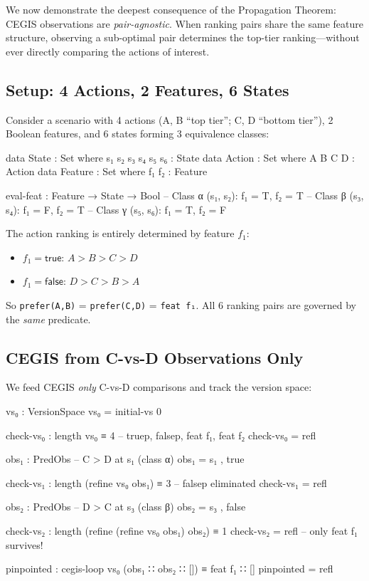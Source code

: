 We now demonstrate the deepest consequence of the Propagation Theorem: CEGIS observations are \emph{pair-agnostic}.  When ranking pairs share the same feature structure, observing a sub-optimal pair determines the top-tier ranking---without ever directly comparing the actions of interest.

\subsection{Setup: 4 Actions, 2 Features, 6 States}

Consider a scenario with 4 actions (A, B ``top tier''; C, D ``bottom tier''), 2 Boolean features, and 6 states forming 3 equivalence classes:

\begin{spec}
data State : Set where s₁ s₂ s₃ s₄ s₅ s₆ : State
data Action : Set where A B C D : Action
data Feature : Set where f₁ f₂ : Feature

eval-feat : Feature → State → Bool
-- Class α (s₁, s₂): f₁ = T, f₂ = T
-- Class β (s₃, s₄): f₁ = F, f₂ = T
-- Class γ (s₅, s₆): f₁ = T, f₂ = F
\end{spec}

\noindent The action ranking is entirely determined by feature $f_1$:
\begin{itemize}
\item $f_1 = \mathsf{true}$: $A > B > C > D$
\item $f_1 = \mathsf{false}$: $D > C > B > A$
\end{itemize}
So \texttt{prefer(A,B)} = \texttt{prefer(C,D)} = \texttt{feat~f₁}.  All 6 ranking pairs are governed by the \emph{same} predicate.

\subsection{CEGIS from C-vs-D Observations Only}

We feed CEGIS \emph{only} C-vs-D comparisons and track the version space:

\begin{spec}
vs₀ : VersionSpace
vs₀ = initial-vs 0

check-vs₀ : length vs₀ ≡ 4       -- truep, falsep, feat f₁, feat f₂
check-vs₀ = refl

obs₁ : PredObs                    -- C > D at s₁ (class α)
obs₁ = s₁ , true

check-vs₁ : length (refine vs₀ obs₁) ≡ 3   -- falsep eliminated
check-vs₁ = refl

obs₂ : PredObs                    -- D > C at s₃ (class β)
obs₂ = s₃ , false

check-vs₂ : length (refine (refine vs₀ obs₁) obs₂) ≡ 1
check-vs₂ = refl                  -- only feat f₁ survives!

pinpointed : cegis-loop vs₀ (obs₁ ∷ obs₂ ∷ []) ≡ feat f₁ ∷ []
pinpointed = refl
\end{spec}

